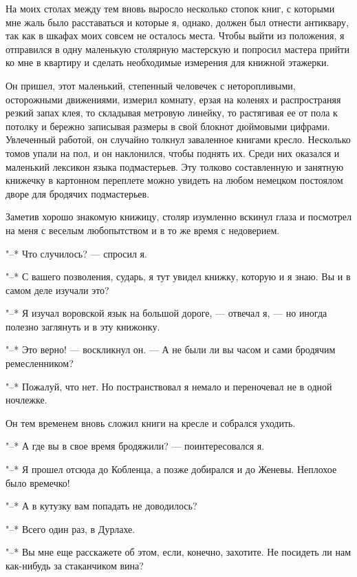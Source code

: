 На  моих столах  между  тем  вновь выросло  несколько  стопок книг,  с
которыми мне  жаль было расставаться  и которые я, однако,  должен был
отнести антиквару,  так как  в шкафах моих  совсем не  осталось места.
Чтобы  выйти из  положения, я  отправился в  одну маленькую  столярную
мастерскую  и попросил  мастера прийти  ко  мне в  квартиру и  сделать
необходимые измерения для книжной этажерки.

Он  пришел,  этот  маленький,  степенный  человечек  с  неторопливыми,
осторожными   движениями,  измерил   комнату,  ерзая   на  коленях   и
распространяя  резкий запах  клея, то  складывая метровую  линейку, то
растягивая ее  от пола к  потолку и  бережно записывая размеры  в свой
блокнот  дюймовыми цифрами.  Увлеченный работой,  он случайно  толкнул
заваленное  книгами  кресло.  Несколько  томов  упали  на  пол,  и  он
наклонился, чтобы поднять их. Среди  них оказался и маленький лексикон
языка  подмастерьев. Эту  толково составленную  и занятную  книжечку в
картонном переплете  можно увидеть  на любом немецком  постоялом дворе
для бродячих подмастерьев.

Заметив  хорошо знакомую  книжицу,  столяр изумленно  вскинул глаза  и
посмотрел на меня с веселым любопытством и в то же время с недоверием.

"--* Что случилось? --- спросил я.

"--* С  вашего позволения, сударь,  я тут  увидел книжку, которую  и я
знаю. Вы и в самом деле изучали это?

"--* Я изучал воровской язык на  большой дороге, --- отвечал я, --- но
иногда полезно заглянуть и в эту книжонку.

"--* Это верно!  --- воскликнул он. ---  А не были ли вы  часом и сами
бродячим ремесленником?

"--* Пожалуй, что  нет. Но постранствовал я немало и  переночевал не в
одной ночлежке.

Он тем временем вновь сложил книги на кресле и собрался уходить.

"--* А где вы в свое время бродяжили? --- поинтересовался я.

"--*  Я прошел  отсюда до  Кобленца, а  позже добирался  и до  Женевы.
Неплохое было времечко!

"--* А в кутузку вам попадать не доводилось?

"--* Всего один раз, в Дурлахе.

"--*  Вы мне  еще  расскажете  об этом,  если,  конечно, захотите.  Не
посидеть ли нам как-нибудь за стаканчиком вина?

